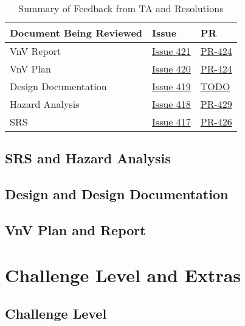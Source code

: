 \documentclass{article}
\begin{document}
\begin{table}[h!]
\centering
\begin{tabularx}{\textwidth}{lXl}
\toprule
\textbf{Document Being Reviewed} & \textbf{Issue} & \textbf{PR} \\
\midrule
VnV Report & \href{https://github.com/SyntaxSentinels/SyntaxSentinels/issues/421}{Issue 421} & \href{https://github.com/SyntaxSentinels/SyntaxSentinels/pull/424}{PR-424} \\
VnV Plan & \href{https://github.com/SyntaxSentinels/SyntaxSentinels/issues/420}{Issue 420} & \href{https://github.com/SyntaxSentinels/SyntaxSentinels/pull/424}{PR-424} \\
Design Documentation & \href{https://github.com/SyntaxSentinels/SyntaxSentinels/issues/419}{Issue 419} & \href{TODO}{TODO} \\
Hazard Analysis & \href{https://github.com/SyntaxSentinels/SyntaxSentinels/issues/418}{Issue 418} & \href{https://github.com/SyntaxSentinels/SyntaxSentinels/pull/429}{PR-429} \\
SRS & \href{https://github.com/SyntaxSentinels/SyntaxSentinels/issues/417}{Issue 417} & \href{https://github.com/SyntaxSentinels/SyntaxSentinels/pull/426}{PR-426} \\

\bottomrule
\end{tabularx}
\caption{Summary of Feedback from TA and Resolutions}
\label{tab:TA_feedback_summary}
\end{table}

\subsection{SRS and Hazard Analysis}

\subsection{Design and Design Documentation}

\subsection{VnV Plan and Report}

\section{Challenge Level and Extras}

\subsection{Challenge Level}
\end{document}
